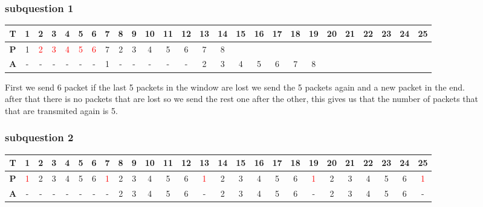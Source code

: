\documentclass{article}
\begin{document}
        \subsubsection{subquestion 1}
        \begin{tabular}{|c|c|c|c|c|c|c|c|c|c|c|c|c|c|c|c|c|c|c|c|c|c|c|c|c|c|}
            \hline
            \textbf{T} & 1 & 2 & 3 & 4 & {5} & 6 & 7 & 8 & 9 & {10} & 11 & 12 & 13 & 14 & {15} & 16 & 17 & 18 & 19 & {20} & 21 & 22 & 23 & 24 & {25}  \\
            \hline
            \textbf{P} & 1 & \textcolor{red}2 & \textcolor{red}3 & \textcolor{red}4 & \textcolor{red}5 & \textcolor{red}6 & 7 & 2 & 3 & 4 & 5 & 6 & 7 & 8\\
            \hline
            \textbf{A} & - & - & - & - & - & - & 1 & - & - & - & - & - & 2 & 3 & 4 & 5 & 6 & 7 & 8 \\
            \hline
        \end{tabular}
        First we send 6 packet if the last 5 packets in the window are lost we send the 5 packets again and a new packet in the end.\\ 
        after that there is no packets that are lost so we send the rest one after the other, this gives us that the number of packets that\\
        that are transmited again is 5.\\
        
        \subsubsection{subquestion 2}
        \begin{tabular}{|c|c|c|c|c|c|c|c|c|c|c|c|c|c|c|c|c|c|c|c|c|c|c|c|c|c|}
            \hline
            \textbf{T} & 1 & 2 & 3 & 4 & {5} & 6 & 7 & 8 & 9 & {10} & 11 & 12 & 13 & 14 & {15} & 16 & 17 & 18 & 19 & {20} & 21 & 22 & 23 & 24 & {25}  \\
            \hline
            \textbf{P} & \textcolor{red}1 & 2 & 3 & 4 & 5 & 6 & \textcolor{red}1 & 2 & 3 & 4 & 5 & 6 & \textcolor{red}1 & 2 & 3 & 4 & 5 & 6 & \textcolor{red}1 & 2 & 3 & 4 & 5 & 6 & \textcolor{red}1\\
            \hline
            \textbf{A} & - & - & - & - & - & - & - & 2 & 3 & 4 & 5 & 6 & - & 2 & 3 & 4 & 5 & 6 & - & 2 & 3 & 4 & 5 & 6 & -  \\
            \hline
        \end{tabular}
\end{document}
